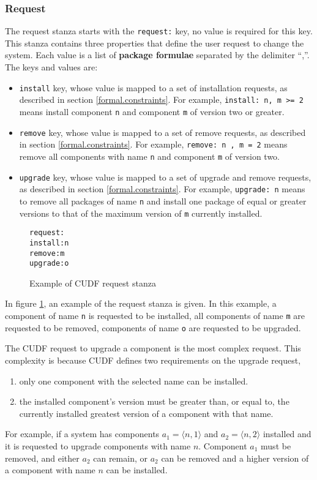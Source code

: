 \subsubsection{Request}
\label{formal.cudfdes.request}
The request stanza starts with the \verb+request:+ key, no value is required for this key.
This stanza contains three properties that define the user request to change the system.
Each value is a list of \textbf{package formulae} separated by the delimiter ``,''.
The keys and values are:
\begin{itemize}
  \item \verb+install+ key, whose value is mapped to a set of installation requests, as described in section \ref{formal.constraints}.
  For example, \verb+install: n, m >= 2+ means install component \verb+n+ and component \verb+m+ of version two or greater.
  \item \verb+remove+ key, whose value is mapped to a set of remove requests, as described in section \ref{formal.constraints}.
  For example, \verb+remove: n , m = 2+ means remove all components with name \verb+n+ and component \verb+m+ of version two.
  \item \verb+upgrade+ key, whose value is mapped to a set of upgrade and remove requests, as described in section \ref{formal.constraints}.
  For example, \verb+upgrade: n+ means to remove all packages of name \verb+n+ and install one package of equal or greater versions to that of the maximum version of \verb+m+ currently installed. 
\end{itemize}

\begin{figure}[htp] 
\begin{center}
\begin{alltt}
request:
install: n
remove: m
upgrade: o
\end{alltt}
  \caption{Example of CUDF request stanza}
  \label{formal.cudfrequeststanza}
\end{center}
\end{figure}

In figure \ref{formal.cudfrequeststanza}, an example of the request stanza is given.
In this example, a component of name \verb+n+ is requested to be installed, all components of name \verb+m+ are requested to be removed,
components of name \verb+o+ are requested to be upgraded.

The CUDF request to upgrade a component is the most complex request.
This complexity is because CUDF defines two requirements on the upgrade request,
\begin{enumerate}
  \item only one component with the selected name can be installed.
  \item the installed component's version must be greater than, or equal to, the currently installed greatest version of a component with that name.
\end{enumerate}
For example, if a system has components $a_1 = \langle n,1 \rangle$ and $a_2 = \langle n,2 \rangle$ installed and it is requested to upgrade components with name $n$.
Component $a_1$ must be removed, and either $a_2$ can remain, or $a_2$ can be removed and a higher version of a component with name $n$ can be installed.

